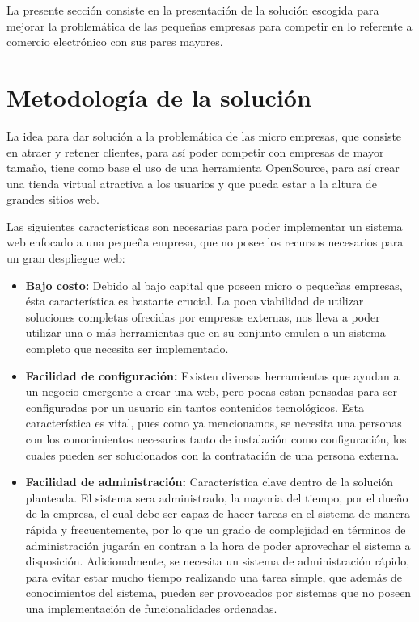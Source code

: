 La presente sección consiste en la presentación de la solución escogida
para mejorar la problemática de las pequeñas empresas para competir en lo
referente a comercio electrónico con sus pares mayores.

\section{Metodología de la solución}

La idea para dar solución a la problemática de las micro empresas,
que consiste en atraer y retener clientes, para así poder competir
con empresas de mayor tamaño, tiene como base el uso de una herramienta
OpenSource, para así crear una tienda virtual atractiva a los usuarios
y que pueda estar a la altura de grandes sitios web.

Las siguientes características son necesarias para poder implementar un sistema
web enfocado a una pequeña empresa, que no posee los recursos necesarios
para un gran despliegue web:

\begin{itemize}
    \item {\bf Bajo costo:}
        Debido al bajo capital que poseen micro o pequeñas empresas,
        ésta característica es bastante crucial.
        La poca viabilidad de utilizar soluciones completas ofrecidas
        por empresas externas, nos lleva a poder utilizar una o más herramientas
        que en su conjunto emulen a un sistema completo que necesita ser
        implementado.

    \item {\bf Facilidad de configuración:}
        Existen diversas herramientas que ayudan a un negocio emergente a crear
        una web, pero pocas estan pensadas para ser configuradas por un usuario
        sin tantos contenidos tecnológicos.
        Esta característica es vital, pues como ya mencionamos,
        se necesita una personas con los conocimientos necesarios tanto
        de instalación como configuración, los cuales pueden ser solucionados
        con la contratación de una persona externa.

    \item {\bf Facilidad de administración:}
        Característica clave dentro de la solución planteada.
        El sistema sera administrado, la mayoria del tiempo, por el dueño de la
        empresa, el cual debe ser capaz de hacer tareas en el sistema
        de manera rápida y frecuentemente, por lo que un grado
        de complejidad en términos de administración jugarán en contran
        a la hora de poder aprovechar el sistema a disposición.
        Adicionalmente, se necesita un sistema de administración rápido,
        para evitar estar mucho tiempo realizando una tarea simple, que
        además de conocimientos del sistema, pueden ser provocados por sistemas
        que no poseen una implementación de funcionalidades ordenadas.

\end{itemize}

